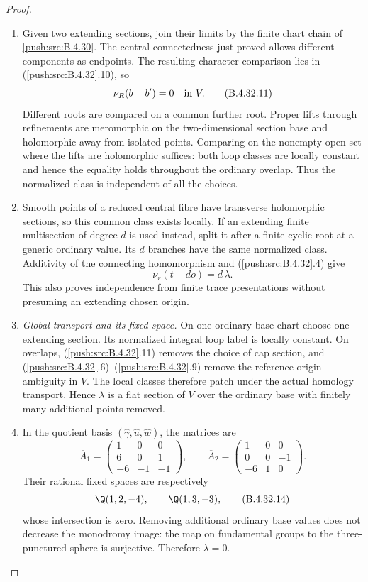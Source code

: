 \begin{proof}
\begin{enumerate}[label=\arabic*.,leftmargin=*]
\item Given two extending sections, join their limits by the finite
chart chain of \ref{push:src:B.4.30}. The central connectedness just proved
allows different components as endpoints. The resulting
character comparison lies in (\ref{push:src:B.4.32}.10), so
\[
               \nu_R(b-b')=0\quad\hbox{in }V.
 \tag{B.4.32.11}
\]
Different roots are compared on a common further root.
Proper lifts through refinements are meromorphic on the
two-dimensional section base and holomorphic away from
isolated points. Comparing on the nonempty open set where
the lifts are holomorphic suffices: both loop classes are
locally constant and hence the equality holds throughout
the ordinary overlap. Thus the normalized class is
independent of all the choices.

\item Smooth points of a reduced central fibre have transverse
holomorphic sections, so this common class exists locally.
If an extending finite multisection of degree $d$ is used
instead, split it after a finite cyclic root at a generic
ordinary value. Its $d$ branches have the same normalized
class. Additivity of the connecting homomorphism and
(\ref{push:src:B.4.32}.4) give
\[
            \nu_r(t-do)=d\,\lambda .
 \tag{B.4.32.12}
\]
This also proves independence from finite trace
presentations without presuming an extending chosen origin.

\item \emph{Global transport and its fixed space.}
On one ordinary base chart choose one extending section.
Its normalized integral loop label is locally constant.
On overlaps, (\ref{push:src:B.4.32}.11) removes the choice of cap section,
and (\ref{push:src:B.4.32}.6)--(\ref{push:src:B.4.32}.9) remove the reference-origin
ambiguity in $V$. The local classes therefore patch under
the actual homology transport. Hence $\lambda$ is a flat
section of $V$ over the ordinary base with finitely many
additional points removed.

\item In the quotient basis
$(\widehat\gamma,\widehat u,\widehat w)$, the matrices are
\[
 \overline A_1=
 \begin{pmatrix}1&0&0\\6&0&1\\-6&-1&-1\end{pmatrix},
 \qquad
 \overline A_2=
 \begin{pmatrix}1&0&0\\0&0&-1\\-6&1&0\end{pmatrix}.
 \tag{B.4.32.13}
\]
Their rational fixed spaces are respectively
\[
 \Q(1,2,-4),\qquad \Q(1,3,-3),
 \tag{B.4.32.14}
\]
whose intersection is zero. Removing additional ordinary
base values does not decrease the monodromy image: the
map on fundamental groups to the three-punctured sphere
is surjective. Therefore $\lambda=0$.


\end{enumerate}
\end{proof}

